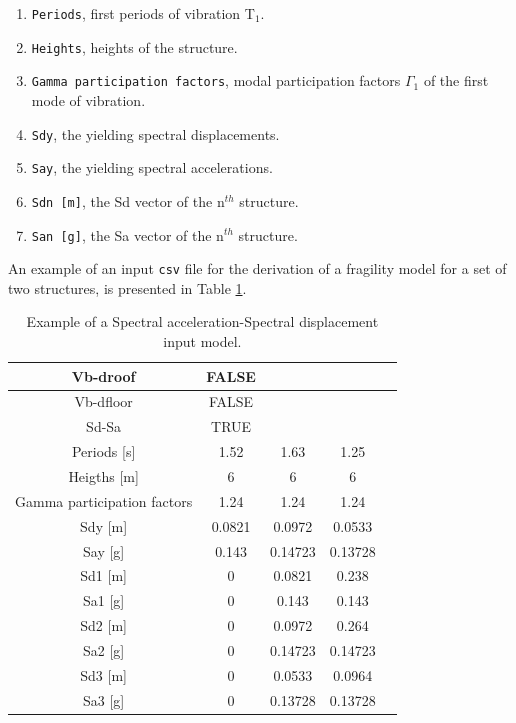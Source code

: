 \begin{enumerate}
\item \verb=Periods=, first periods of vibration T$_1$.
\item \verb=Heights=, heights of the structure.
\item \verb=Gamma participation factors=, modal participation factors $\Gamma_1$ of the first mode of vibration.
\item \verb=Sdy=, the yielding spectral displacements.
\item \verb=Say=, the yielding spectral accelerations.
\item \verb=Sdn [m]=, the Sd vector of the n$^{th}$ structure.
\item \verb=San [g]=, the Sa vector of the n$^{th}$ structure. \\
\end{enumerate}

An example of an input \verb=csv= file for the derivation of a fragility model for a set of two structures, is presented in Table \ref{table:Vb-dfloor_input}.

\begin {table}[htb]
\caption{Example of a Spectral acceleration-Spectral displacement input model.}
\label{table:Vb-dfloor_input}
\begin{center}
  \begin{tabular}{ | c | c | c | c | c |}
  \hline
	Vb-droof &	FALSE & &  \\ \hline
	Vb-dfloor & 	FALSE & & \\ \hline
	Sd-Sa &	TRUE & & \\ \hline
	Periods [s] &	1.52 &	1.63 &	1.25 \\ \hline
	Heigths [m]	& 6 &	6	& 6 \\ \hline
	Gamma participation factors	& 1.24 &	1.24 &	1.24 \\ \hline
	Sdy [m] & 	0.0821 & 	0.0972 &	0.0533\\ \hline
	Say [g]	& 0.143	& 0.14723	& 0.13728 \\ \hline
	Sd1 [m]	& 0 &	0.0821	& 0.238 \\ \hline
	Sa1 [g]	& 0	& 0.143	& 0.143 \\ \hline
	Sd2 [m] &	0 & 0.0972	& 0.264 \\ \hline
	Sa2 [g]	& 0	& 0.14723	& 0.14723 \\ \hline
	Sd3 [m]	& 0	& 0.0533	& 0.0964 \\ \hline
	Sa3 [g]	& 0	& 0.13728	& 0.13728 \\ \hline
  \end{tabular}
\end{center}
\end{table}